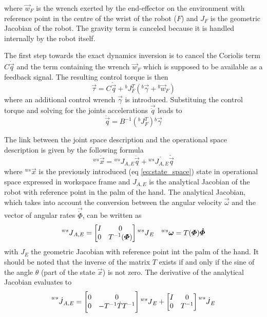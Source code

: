 where $\vec{w}_{F}$ is the wrench exerted by the end-effector on the environment with reference point in the centre
of the wrist of the robot ($F$) and $J_{F}$ is the geometric Jacobian of the robot.
The gravity term is canceled because it is handled internally by the robot itself.
\par
The first step towards the exact dynamics inversion is to cancel the Coriolis term
$C \dot{\vec{q}}$ and the term containing the wrench $\vec{w}_{F}$ which is supposed to
be available as a feedback signal. The resulting control torque is then
\[
\vec{\tau} = C \dot{\vec{q}} + {}^{b}J^{T}_{F} ({}^b\vec{\gamma} + {}^b\vec{w}_{F})
\]
where an additional control wrench $\vec{\gamma}$ is introduced.
Substituing the control torque and solving for the joints accelerations $\vec{\ddot{q}}$
leads to
\begin{equation}\label{eq:qddot}
  \ddot{\vec{q}} = B^{-1} ({}^{b}J^{T}_{F}) {}^b\vec{\gamma}
\end{equation}
\par
The link between the joint space description and the operational space description
is given by the following formula
\begin{equation}
  \label{eq:ws_a}
  {}^{ws} \ddot{\vec{x}} = {}^{ws} J_{A,E} \ddot{\vec{q}} + {}^{ws} \dot{J_{A,E}} \dot{\vec{q}}
\end{equation}
where ${}^{ws} \vec{x}$ is the previously introduced (eq \ref{eq:state_space}) state in operational space expressed in workspace
frame and $J_{A,E}$ is the analytical Jacobian of the robot with reference point in the palm of the hand.
The analytical Jacobian, which takes into account the conversion between the angular velocity $\vec{\omega}$
and the vector of angular rates $\vec{\dot{\Phi}}$, can be written as
\[
\prescript{ws}{}{J}_{A,E} = 
\begin{bmatrix}
  I & 0 \\
  0 & T^{-1}(\vec{\Phi})
\end{bmatrix}
\prescript{ws}{}{J}_{E} \quad {}^{ws}\vec{\omega} = T(\vec{\Phi}) \vec{\dot{\Phi}}
\]
with $J_E$ the geometric Jacobian with reference point int the palm of the hand. It should be noted
that the inverse of the matrix $T$ exists if and only if the sine of the angle $\theta$ (part of the state
$\vec{x}$) is not zero. The derivative of the analytical Jacobian evaluates to
\[
\prescript{ws}{}{\dot{J}}_{A,E} = 
\begin{bmatrix}
  0 & 0 \\
  0 & -T^{-1} \dot{T} T^{-1}
\end{bmatrix}
\prescript{ws}{}{J}_{E} + 
\begin{bmatrix}
  I & 0 \\
  0 & T^{-1}
\end{bmatrix}
\prescript{ws}{}{\dot{J}}_{E}
\]
